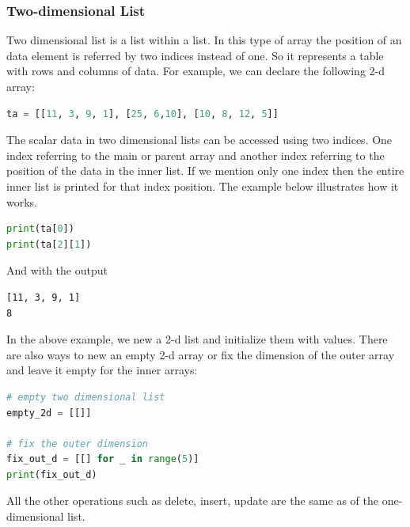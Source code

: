 \documentclass[../main.tex]{subfiles}
\begin{document}
\subsubsection{Two-dimensional List}
Two dimensional list is a list within a list.  In this type of array the position of an data element is referred by two indices instead of one. So it represents a table with rows and columns of data. For example, we can declare the following 2-d array:
\begin{lstlisting}[language=Python]
ta = [[11, 3, 9, 1], [25, 6,10], [10, 8, 12, 5]]
\end{lstlisting}
The scalar data in two dimensional lists can be accessed using two indices. One index referring to the main or parent array and another index referring to the position of the data  in the inner list. If we mention only one index then the entire inner list is printed for that index position. The example below illustrates how it works. 
\begin{lstlisting}[language=Python]
print(ta[0])
print(ta[2][1])
\end{lstlisting}
And with the output
\begin{lstlisting}[numbers=none]
[11, 3, 9, 1]
8
\end{lstlisting}
In the above example, we new a 2-d list and initialize them with values. There are also ways to new an empty 2-d array or fix the dimension of the outer array and leave it empty for the inner arrays:
\begin{lstlisting}[language=Python]
# empty two dimensional list
empty_2d = [[]]

# fix the outer dimension
fix_out_d = [[] for _ in range(5)]
print(fix_out_d)
\end{lstlisting}
All the other operations such as delete, insert, update are the same as of the one-dimensional list. 
\end{document}
